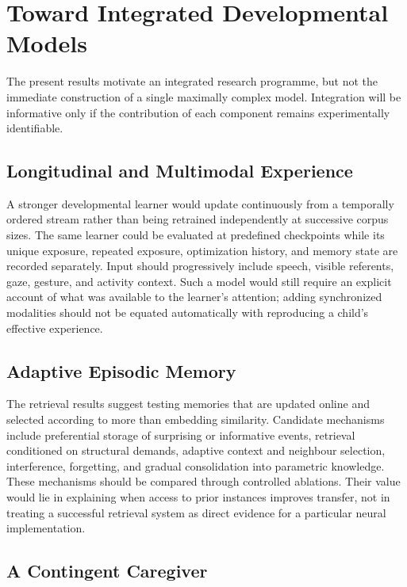 \section{Toward Integrated Developmental Models}
\label{sec:gd_future}

The present results motivate an integrated research programme, but not the immediate construction of a single maximally complex model. Integration will be informative only if the contribution of each component remains experimentally identifiable.

\subsection{Longitudinal and Multimodal Experience}

A stronger developmental learner would update continuously from a temporally ordered stream rather than being retrained independently at successive corpus sizes. The same learner could be evaluated at predefined checkpoints while its unique exposure, repeated exposure, optimization history, and memory state are recorded separately. Input should progressively include speech, visible referents, gaze, gesture, and activity context. Such a model would still require an explicit account of what was available to the learner's attention; adding synchronized modalities should not be equated automatically with reproducing a child's effective experience.

\subsection{Adaptive Episodic Memory}

The retrieval results suggest testing memories that are updated online and selected according to more than embedding similarity. Candidate mechanisms include preferential storage of surprising or informative events, retrieval conditioned on structural demands, adaptive context and neighbour selection, interference, forgetting, and gradual consolidation into parametric knowledge. These mechanisms should be compared through controlled ablations. Their value would lie in explaining when access to prior instances improves transfer, not in treating a successful retrieval system as direct evidence for a particular neural implementation.

\subsection{A Contingent Caregiver}

